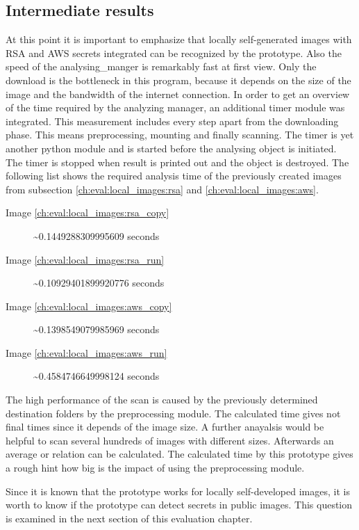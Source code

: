 \subsection{Intermediate results}
At this point it is important to emphasize that locally self-generated images with RSA and AWS secrets integrated can be recognized by the prototype. Also the speed of the analysing\_manger is remarkably fast at first view. 
Only the download is the bottleneck in this program, because it depends on the size of the image and the bandwidth of the internet connection. In order to get an overview of the time required by the analyzing manager, an additional timer module was integrated. This measurement includes every step apart from the downloading phase. This means preprocessing, mounting and finally scanning.
The timer is yet another python module and is started before the analysing object is initiated. The timer is stopped when result is printed out and the object is destroyed.
The following list shows the required analysis time of the previously created images from subsection \ref{ch:eval:local_images:rsa} and \ref{ch:eval:local_images:aws}. 
\begin{description}
\item [Image \ref{ch:eval:local_images:rsa_copy}] \textasciitilde 0.1449288309995609 seconds
\item [Image \ref{ch:eval:local_images:rsa_run}] \textasciitilde 0.10929401899920776 seconds
\item [Image \ref{ch:eval:local_images:aws_copy}] \textasciitilde 0.1398549079985969 seconds
\item [Image \ref{ch:eval:local_images:aws_run}] \textasciitilde 0.4584746649998124 seconds
\end{description}
The high performance of the scan is caused by the previously determined destination folders by the preprocessing module. The calculated time gives not final times since it depends of the image size. A further anayalsis would be helpful to scan several hundreds of images with different sizes. Afterwards an average or relation can be calculated. The calculated time by this prototype gives a rough hint how big is the impact of using the preprocessing module.

Since it is known that the prototype works for locally self-developed images, it is worth to know if the prototype can detect secrets in public images.
This question is examined in the next section of this evaluation chapter.